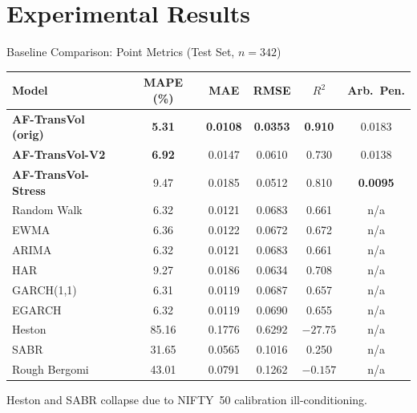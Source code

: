 \documentclass[aspectratio=169,10pt]{beamer}
\begin{document}
\section{Experimental Results}

\begin{frame}{Baseline Comparison: Point Metrics (Test Set, $n{=}342$)}
  \centering\vspace{2pt}
  \scriptsize
  \begin{tabular}{lccccc}
    \toprule
    \textbf{Model} & \textbf{MAPE (\%)} & \textbf{MAE} & \textbf{RMSE} & \textbf{$R^2$} & \textbf{Arb.\ Pen.} \\
    \midrule
    \textbf{AF-TransVol (orig)} & \alert{\textbf{5.31}}  & \alert{\textbf{0.0108}} & \alert{\textbf{0.0353}} & \alert{\textbf{0.910}} & 0.0183 \\
    \textbf{AF-TransVol-V2}     & \alert{\textbf{6.92}}  & 0.0147                  & 0.0610                  & 0.730                  & 0.0138 \\
    \textbf{AF-TransVol-Stress} & 9.47                   & 0.0185                  & 0.0512                  & 0.810                  & \alert{\textbf{0.0095}} \\
    \midrule
    Random Walk   & 6.32  & 0.0121 & 0.0683 & 0.661   & n/a \\
    EWMA          & 6.36  & 0.0122 & 0.0672 & 0.672   & n/a \\
    ARIMA         & 6.32  & 0.0121 & 0.0683 & 0.661   & n/a \\
    HAR           & 9.27  & 0.0186 & 0.0634 & 0.708   & n/a \\
    GARCH(1,1)    & 6.31  & 0.0119 & 0.0687 & 0.657   & n/a \\
    EGARCH        & 6.32  & 0.0119 & 0.0690 & 0.655   & n/a \\
    Heston        & 85.16 & 0.1776 & 0.6292 & $-27.75$ & n/a \\
    SABR          & 31.65 & 0.0565 & 0.1016 & 0.250   & n/a \\
    Rough Bergomi & 43.01 & 0.0791 & 0.1262 & $-0.157$ & n/a \\
    \bottomrule
  \end{tabular}
  \par\vspace{5pt}
  {\footnotesize Heston and SABR collapse due to NIFTY~50 calibration ill-conditioning.}
\end{frame}
\end{document}
